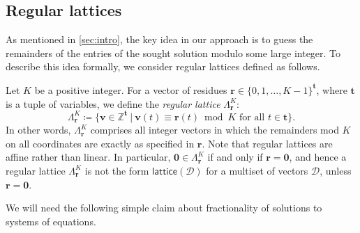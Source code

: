 \documentclass{article}
\newcommand{\Dd}{\mathcal{D}}
\newcommand{\Z}{\mathbb{Z}}
\newcommand{\tup}[1]{{\mathbf{#1}}}
\newcommand{\tv}{\tup t}
\newcommand{\rr}{\tup r}
\newcommand{\myvv}{\tup v} %
\newcommand{\zero}{\tup 0}
\newcommand{\lattice}{\mathsf{lattice}}
\begin{document}
\subsection{Regular lattices}

As mentioned in \cref{sec:intro}, the key idea in our approach is to guess the remainders of the entries of the sought solution modulo some large integer. To describe this idea formally, we consider regular lattices defined as follows.

Let $K$ be a positive integer. For a vector of residues $\rr\in \{0,1,\ldots,K-1\}^\tv$, where $\tv$ is a tuple of variables, we define the {\em{regular lattice}} $\Lambda^K_{\rr}$:
$$\Lambda^K_{\rr}\coloneqq \{\myvv\in \Z^{\tv}~|~\myvv(t)\equiv \rr(t)\bmod K\textrm{ for all }t\in \tv\}.$$
In other words, $\Lambda^K_\rr$ comprises all integer vectors in which the remainders mod $K$ on all coordinates are exactly as specified in $\rr$. Note that regular lattices are affine rather than linear. In particular, $\zero\in \Lambda^K_\rr$ if and only if $\rr=\zero$, and hence a regular lattice $\Lambda^K_\rr$ is not the form $\lattice(\Dd)$ for a multiset of vectors $\Dd$, unless $\rr=\zero$.

We will need the following simple claim about fractionality of solutions to systems of equations.
\end{document}
